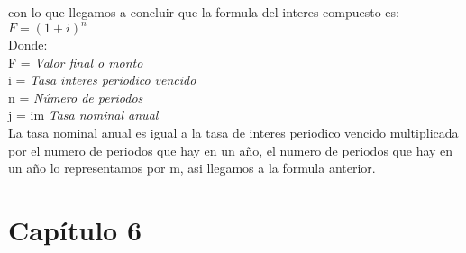 \begin{spacing}{1.5}
    con lo que llegamos a concluir que la formula del interes compuesto es:\\
    $F = (1+i)^n$\\
    Donde:
    \\
    F = \hspace{32pt}  \textit{Valor final o monto}\\
    i = \hspace{35pt}  \textit{Tasa interes periodico vencido} \\
    n = \hspace{34pt}  \textit{Número  de periodos}\\   %
    j = im \hspace{23pt}  \textit{Tasa nominal anual}\\
    La tasa nominal anual es igual a la tasa de interes periodico vencido multiplicada por el numero de periodos que hay en un año, el numero de periodos que hay en un año lo representamos por m, asi llegamos a la formula anterior.\\
    
    
\end{spacing}

\section{Capítulo 6}

